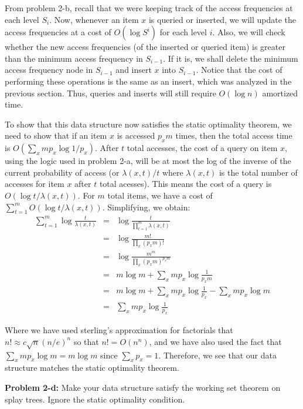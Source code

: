 \documentclass[psamsfonts]{amsart}
\newenvironment{sol}{\vspace{0.25cm}{\large \bfseries Solution:}}{\qedsymbol}
\newenvironment{prob}[1]{\begin{framed}{\large \bfseries Problem #1:}}{\end{framed}}
\begin{document}
\begin{sol}
From problem 2-b, recall that we were keeping track of the access frequencies at each level $S_i$. Now, whenever an item $x$ is queried or inserted, we will update the access frequencies at a cost of $O(\log S^i)$ for each level $i$. Also, we will check whether the new access frequencies (of the inserted or queried item) is greater than the minimum access frequency in $S_{i-1}$. If it is, we shall delete the minimum access frequency node in $S_{i-1}$ and insert $x$ into $S_{i-1}$. Notice that the cost of performing these operations is the same as an insert, which was analyzed in the previous section. Thus, queries and inserts will still require $O(\log n)$ amortized time. 

To show that this data structure now satisfies the static optimality theorem, we need to show that if an item $x$ is accessed $p_x m$ times, then the total access time is $O(\sum_{x} m p_x \log 1/p_x)$. After $t$ total accesses, the cost of a query on item $x$, using the logic used in problem 2-a, will be at most the log of the inverse of the current probability of access (or $\lambda(x,t)/t$ where $\lambda(x,t)$ is the total number of accesses for item $x$ after $t$ total acesses). This means the cost of a query is $O(\log t/\lambda(x,t))$. For $m$ total items, we have a cost of $\sum_{t=1}^m O(\log t/\lambda(x,t))$. Simplifying, we obtain:
\begin{eqnarray}
\sum_{t=1}^m \log \frac{t}{\lambda(x,t)} &=& \log \frac{t}{\prod_{t=1}^m \lambda(x,t)} \\
&=& \log \frac{m!}{\prod_{x}(p_x m)!} \\
&=& \log \frac{m^{m}}{\prod_{x}(p_x m)^{p_x m}} \\
&=& m \log m + \sum_{x} m p_x \log \frac{1}{p_xm} \\
&=& m \log m + \sum_{x} m p_x \log \frac{1}{p_x} - \sum_x m p_x \log m \\
&=& \sum_{x} m p_x \log \frac{1}{p_x}
\end{eqnarray}

Where we have used sterling's approximation for factorials that $n! \approx c\sqrt{n}(n/e)^n$ so that $n! = O(n^n)$, and we have also used the fact that $\sum_{x} m p_x \log m = m \log m$ since $\sum_{x} p_x = 1$. Therefore, we see that our data structure matches the static optimality theorem.
\end{sol}

\begin{prob}{2-d}
Make your data structure satisfy the working set theorem on splay trees. Ignore the static optimality condition.
\end{prob}
\end{document}
